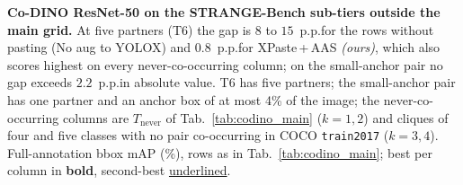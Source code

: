 \begin{table}[!htp]%
\centering
\small
\caption{\textbf{Co-DINO ResNet-50 on the STRANGE-Bench sub-tiers outside the main grid.} At five partners (T6) the gap is $8$ to $15$~p.p.\@ for the rows without pasting (No aug to YOLOX) and $0.8$~p.p.\@ for XPaste\,+\,AAS \emph{(ours)}, which also scores highest on every never-co-occurring column; on the small-anchor pair no gap exceeds $2.2$~p.p.\@ in absolute value. T6 has five partners; the small-anchor pair has one partner and an anchor box of at most 4\% of the image; the never-co-occurring columns are $T_{\text{never}}$ of Tab.~\ref{tab:codino_main} ($k = 1, 2$) and cliques of four and five classes with no pair co-occurring in COCO \texttt{train2017} ($k = 3, 4$). Full-annotation bbox mAP (\%), rows as in Tab.~\ref{tab:codino_main}; best per column in \textbf{bold}, second-best \underline{underlined}.}
\label{tab:codino_extra_tiers}
\resizebox{\linewidth}{!}{%

}
\end{table}
